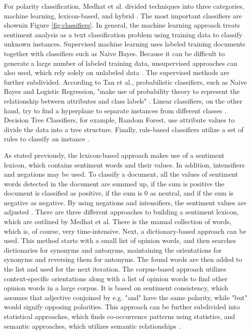 For polarity classification, Medhat et al. divided techniques into three categories, machine learning, lexicon-based, and hybrid \cite{MEDHAT20141093}. The most important classifiers are shownin Figure \ref{fig:classifiers}. In general, the machine learning approach treats sentiment analysis as a text classification problem using training data to classify unknown instances. Supervised machine learning uses labeled training documents together with classifiers such as Naive Bayes. Because it can be difficult to generate a large number of labeled training data, unsupervised approaches can also used, which rely solely on unlabeled data \cite{MEDHAT20141093}. The supervised methods are further subdivided. According to Tan et al., probabilistic classifiers, such as Naive Bayes and Logistic Regression, "make use of probability theory to represent the relationship between attributes and class labels" \cite[p.~414]{DBLP:books/aw/TanSKK2019}. Linear classifiers, on the other hand, try to find a hyperplane to separate instances from different classes \cite{MEDHAT20141093}. Decision Tree Classifiers, for example, Random Forest, use attribute values to divide the data into a tree structure. Finally, rule-based classifiers utilize a set of rules to classify an instance \cite{DBLP:books/aw/TanSKK2019}.

As stated previously, the lexicon-based approach makes use of a sentiment lexicon, which contains sentiment words and their values. In addition, intensifiers and negations may be used. To classify a document, all the values of sentiment words detected in the document are summed up, if the sum is positive the document is classified as positive, if the sum is 0 as neutral, and if the sum is negative as negative. By using negations and intensifiers, the sentiment values are adjusted \cite{liu_2015}. There are three different approaches to building a sentiment lexicon, which are outlined by Medhat et al. There is the manual collection of words, which is, of course, very time-intensive. Next, a dictionary-based approach can be used. This method starts with a small list of opinion words, and then searches dictionaries for synonyms and antonyms, maintaining the orientations for synonyms and reversing them for antonyms. The found words are then added to the list and used for the next iteration. The corpus-based approach utilizes context-specific orientations along with a list of opinion words to find other opinion words in a large corpus. It is based on sentiment consistency, which assumes that adjective conjoined by e.g. "and" have the same polarity, while "but" would signify opposing polarities. This approach can be further subdivided into statistical approaches, which finds co-occurrence patterns using statistics, and semantic approaches, which utilizes semantic relationships \cite{MEDHAT20141093}.

